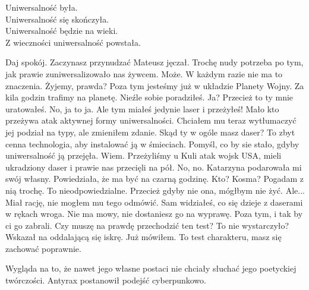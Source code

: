 Uniwersalność była. \\
Uniwersalność się skończyła. \\
Uniwersalność będzie na wieki. \\
Z wieczności uniwersalność powstała. \\

\begin{dialogue}
\ds{} Daj spokój. Zaczynasz przynudzać \dm{} Mateusz jęczał. 
\ds{} Trochę nudy potrzeba po tym, jak prawie zuniwersalizowało nas żywcem.
\ds{} Może. W każdym razie nie ma to znaczenia. Żyjemy, prawda? Poza tym jesteśmy już w układzie Planety Wojny. Za kila godzin trafimy na planetę.
\ds{} Nieźle sobie poradziłeś.
\ds{} Ja? Przecież to ty mnie uratowałeś. 
\ds{} No, ja to ja. Ale tym miałeś jedynie laser i przeżyłeś! Mało kto przeżywa atak aktywnej formy uniwersalności. \dm{} Chciałem mu teraz wytłumaczyć jej podział na typy, ale zmieniłem zdanie. \dm{}
Skąd ty w ogóle masz daser? To zbyt cenna technologia, aby instalować ją w śmieciach. Pomyśl, co by sie stało, gdyby uniwersalność ją przejęła.
\ds{} Wiem. Przeżyliśmy u Kuli atak wojsk USA, mieli ukradziony daser i prawie nas przecięli na pół.
\ds{} No, no.
\ds{} Katarzyna podarowała mi swój własny. Powiedziała, że ma być na czarną godzinę.
\ds{} Kto? Kosma? Pogadam z nią trochę. To nieodpowiedzialne.
\ds{} Przecież gdyby nie ona, mógłbym nie żyć.
\ds{} Ale... \dm{} Miał rację, nie mogłem mu tego odmówić. \dm{} Sam widziałeś, co się dzieje z daserami w rękach wroga. Nie ma mowy, nie dostaniesz go na wyprawę.
Poza tym, i tak by ci go zabrali.
\ds{} Czy muszę na prawdę przechodzić ten test? To nie wystarczyło? \dm{} Wskazał na oddalającą się iskrę.
\ds{} Już mówiłem. To test charakteru, masz się zachować poprawnie.
\end{dialogue}

\divider{}

Wygląda na to, że nawet jego własne postaci nie chciały słuchać jego poetyckiej twórczości.
Antyrax postanowił podejść cyberpunkowo. 

\divider{}



















